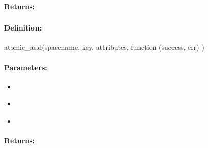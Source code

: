 \paragraph{Returns:}


\pagebreak
\subsubsection{}
\label{api:nodejs:atomic_add}


\paragraph{Definition:}
\begin{javascriptcode}
atomic_add(spacename, key, attributes, function (success, err) {})
\end{javascriptcode}
\paragraph{Parameters:}
\begin{itemize}[noitemsep]
\item {}\\

\item {}\\

\item {}\\

\end{itemize}

\paragraph{Returns:}


\pagebreak
\subsubsection{}
\label{api:nodejs:cond_atomic_add}


